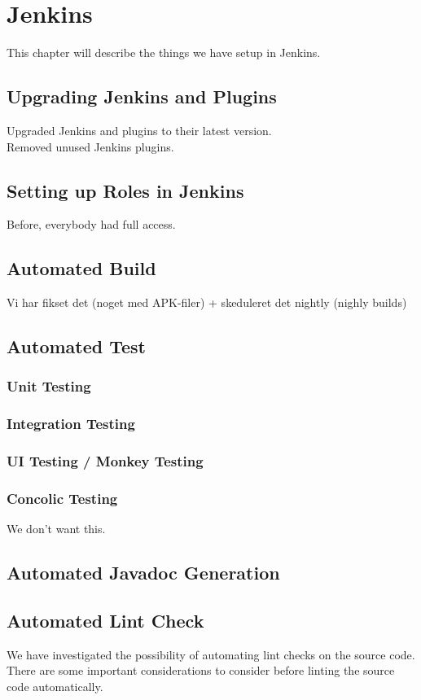 \chapter{Jenkins}%
This chapter will describe the things we have setup in Jenkins.

\section{Upgrading Jenkins and Plugins}
Upgraded Jenkins and plugins to their latest version.\\
Removed unused Jenkins plugins.

\section{Setting up Roles in Jenkins}
Before, everybody had full access.

\section{Automated Build}
Vi har fikset det (noget med APK-filer) + skeduleret det nightly (nighly builds)

\section{Automated Test}
\subsection{Unit Testing}
\subsection{Integration Testing}
\subsection{UI Testing / Monkey Testing}
\subsection{Concolic Testing}
We don't want this.

\section{Automated Javadoc Generation}

\section{Automated Lint Check}
We have investigated the possibility of automating lint checks on the source code. There are some important considerations to consider before linting the source code automatically.

